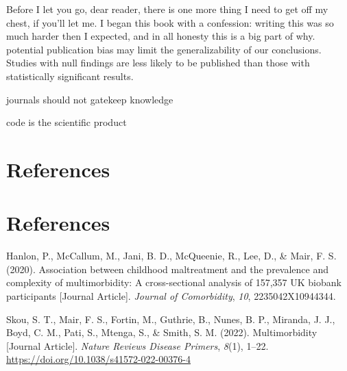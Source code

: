 \documentclass[
  letterpaper,
  DIV=11,
  numbers=noendperiod]{scrreport}
\newlength{\cslhangindent}
\newenvironment{CSLReferences}[2] %
 {\begin{list}{}{%
  \setlength{\itemindent}{0pt}
  \setlength{\leftmargin}{0pt}
  \setlength{\parsep}{0pt}
  \ifodd #1
   \setlength{\leftmargin}{\cslhangindent}
   \setlength{\itemindent}{-1\cslhangindent}
  \fi
  \setlength{\itemsep}{#2\baselineskip}}}
 {\end{list}}
\begin{document}
Before I let you go, dear reader, there is one more thing I need to get
off my chest, if you'll let me. I began this book with a confession:
writing this was so much harder then I expected, and in all honesty this
is a big part of why. potential publication bias may limit the
generalizability of our conclusions. Studies with null findings are less
likely to be published than those with statistically significant
results.

journals should not gatekeep knowledge

code is the scientific product

\section*{References}\label{references-7}


\section*{References}\label{bibliography--7}

\label{refs--7}
\begin{CSLReferences}{1}{0}
Hanlon, P., McCallum, M., Jani, B. D., McQueenie, R., Lee, D., \& Mair,
F. S. (2020). Association between childhood maltreatment and the
prevalence and complexity of multimorbidity: A cross-sectional analysis
of 157,357 UK biobank participants {[}Journal Article{]}. \emph{Journal
of Comorbidity}, \emph{10}, 2235042X10944344.

Skou, S. T., Mair, F. S., Fortin, M., Guthrie, B., Nunes, B. P.,
Miranda, J. J., Boyd, C. M., Pati, S., Mtenga, S., \& Smith, S. M.
(2022). Multimorbidity {[}Journal Article{]}. \emph{Nature Reviews
Disease Primers}, \emph{8}(1), 1--22.
\url{https://doi.org/10.1038/s41572-022-00376-4}

\end{CSLReferences}
\end{document}

